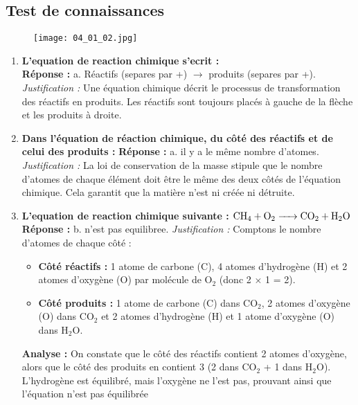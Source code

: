 \documentclass[a4paper,12pt]{article}
\begin{document}
\subsection{Test de connaissances}


\begin{figure}[H]
  \centering
  \texttt{[image: 04\_01\_02.jpg]}
\end{figure}


\begin{enumerate}
  \item \textbf{L'equation de reaction chimique s'ecrit :} \\
  \textbf{Réponse :} a. Réactifs (separes par +) $\rightarrow$ produits (separes par +). \\
  \textit{Justification :} Une équation chimique décrit le processus de transformation des réactifs en produits. Les réactifs sont toujours placés à gauche de la flèche et les produits à droite.

  \item \textbf{Dans l'\'equation de r\'eaction chimique, du c\^ot\'e des r\'eactifs et de celui des produits :} \newline
  \textbf{Réponse :} a. il y a le m\^eme nombre d'atomes. \newline
  \textit{Justification :} La loi de conservation de la masse stipule que le nombre d'atomes de chaque élément doit être le même des deux côtés de l'équation chimique. Cela garantit que la matière n'est ni créée ni détruite.

  \item \textbf{L'equation de reaction chimique suivante : $\ce{CH4 + O2 -> CO2 + H2O}$} \newline
  \textbf{Réponse :} b. n'est pas equilibree. \newline
  \textit{Justification :} Comptons le nombre d'atomes de chaque côté :
  \begin{itemize}
      \item \textbf{Côté réactifs :} 1 atome de carbone (C), 4 atomes d'hydrogène (H) et 2 atomes d'oxygène (O) par molécule de O$_2$ (donc 2 $\times$ 1 = 2).
      \item \textbf{Côté produits :} 1 atome de carbone (C) dans CO$_2$, 2 atomes d'oxygène (O) dans CO$_2$ et 2 atomes d'hydrogène (H) et 1 atome d'oxygène (O) dans H$_2$O.
  \end{itemize}
  \textbf{Analyse :} On constate que le côté des réactifs contient 2 atomes d'oxygène, alors que le côté des produits en contient 3 (2 dans CO$_2$ + 1 dans H$_2$O). L'hydrogène est équilibré, mais l'oxygène ne l'est pas, prouvant ainsi que l'équation n'est pas équilibrée
\end{enumerate}
\end{document}
